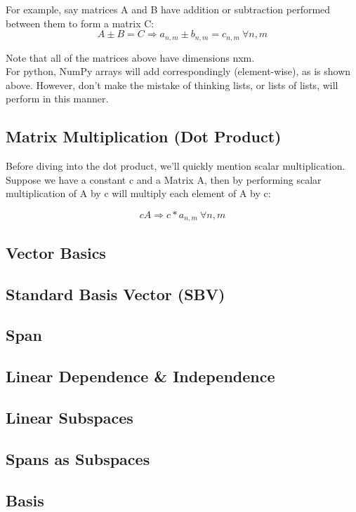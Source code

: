For example, say matrices A and B have addition or subtraction performed between them to form a matrix C:
\begin{equation}
	A \pm B = C \Longrightarrow a_{n, m} \pm b_{n, m} = c_{n, m} \: \forall n, m
\end{equation}

Note that all of the matrices above have dimensions nxm.
\\

For python, NumPy arrays will add correspondingly (element-wise), as is shown above. However, don't make the mistake of thinking lists, or lists of lists, will perform in this manner.

\subsection{Matrix Multiplication (Dot Product)}\label{concept1.3}
Before diving into the dot product, we'll quickly mention scalar multiplication. Suppose we have a constant c and a Matrix A, then by performing scalar multiplication of A by c will multiply each element of A by c:

\begin{equation}
	cA \Longrightarrow c*a_{n, m} \: \forall n, m
\end{equation}



\subsection{Vector Basics}\label{concept1.4}

\subsection{Standard Basis Vector (SBV)}\label{concept1.5}

\subsection{Span}\label{concept1.6}

\subsection{Linear Dependence \& Independence}\label{concept1.7}

\subsection{Linear Subspaces}\label{concept1.8}

\subsection{Spans as Subspaces}\label{concept1.9}

\subsection{Basis}\label{concept1.10}


